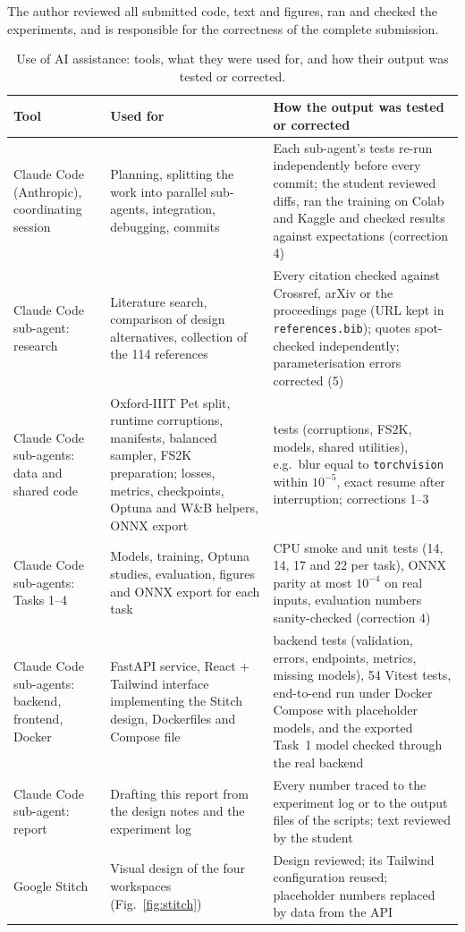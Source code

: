 \documentclass[conference]{IEEEtran}
\begin{document}
The author reviewed all submitted code, text and figures, ran and checked the
experiments, and is responsible for the correctness of the complete submission.

\begin{table}[t]
\caption{Use of AI assistance: tools, what they were used for, and how their
output was tested or corrected.}
\label{tab:aiuse}
\centering
\footnotesize
\begin{tabular}{@{}>{\raggedright\arraybackslash}p{2.7cm}%
>{\raggedright\arraybackslash}p{5.6cm}>{\raggedright\arraybackslash}p{8.6cm}@{}}
\toprule
Tool & Used for & How the output was tested or corrected \\
\midrule
Claude Code (Anthropic), coordinating session & Planning, splitting the work
into parallel sub-agents, integration, debugging, commits & Each sub-agent's tests
re-run independently before every commit; the student reviewed diffs, ran the
training on Colab and Kaggle and checked results against expectations
(correction 4) \\
\addlinespace[2pt]
Claude Code sub-agent: research & Literature search, comparison of design
alternatives, collection of the 114 references & Every citation checked against
Crossref, arXiv or the proceedings page (URL kept in \texttt{references.bib});
quotes spot-checked independently; parameterisation errors corrected (5) \\
\addlinespace[2pt]
Claude Code sub-agents: data and shared code & Oxford-IIIT Pet split, runtime
corruptions, manifests, balanced sampler, FS2K preparation; losses, metrics,
checkpoints, Optuna and W\&B helpers, ONNX export & 44 tests (corruptions,
FS2K, models, shared utilities), e.g.\ blur equal to \texttt{torchvision} within
$10^{-5}$, exact resume after interruption; corrections 1--3 \\
\addlinespace[2pt]
Claude Code sub-agents: Tasks 1--4 & Models, training, Optuna studies,
evaluation, figures and ONNX export for each task & 67 CPU smoke and unit tests
(14, 14, 17 and 22 per task), ONNX parity at most $10^{-4}$ on real inputs,
evaluation numbers sanity-checked (correction 4) \\
\addlinespace[2pt]
Claude Code sub-agents: backend, frontend, Docker & FastAPI service, React +
Tailwind interface implementing the Stitch design, Dockerfiles and Compose file
& 97 backend tests (validation, errors, endpoints, metrics, missing models), 54
Vitest tests, end-to-end run under Docker Compose with placeholder models, and the
exported Task~1 model checked through the real backend \\
\addlinespace[2pt]
Claude Code sub-agent: report & Drafting this report from the design notes and
the experiment log & Every number traced to the experiment log or to the output
files of the scripts; text reviewed by the student \\
\addlinespace[2pt]
Google Stitch & Visual design of the four workspaces
(Fig.~\ref{fig:stitch}) & Design reviewed; its Tailwind configuration reused;
placeholder numbers replaced by data from the API \\
\bottomrule
\end{tabular}
\end{table}
\end{document}
